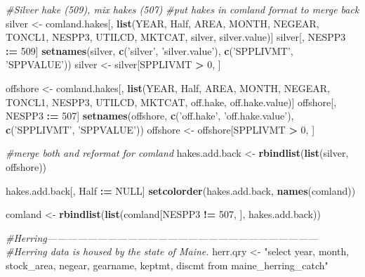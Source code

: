 \documentclass[]{article}
\newenvironment{Shaded}{\begin{snugshade}}{\end{snugshade}}
\newcommand{\KeywordTok}[1]{\textcolor[rgb]{0.13,0.29,0.53}{\textbf{#1}}}
\newcommand{\DecValTok}[1]{\textcolor[rgb]{0.00,0.00,0.81}{#1}}
\newcommand{\StringTok}[1]{\textcolor[rgb]{0.31,0.60,0.02}{#1}}
\newcommand{\CommentTok}[1]{\textcolor[rgb]{0.56,0.35,0.01}{\textit{#1}}}
\newcommand{\OtherTok}[1]{\textcolor[rgb]{0.56,0.35,0.01}{#1}}
\newcommand{\OperatorTok}[1]{\textcolor[rgb]{0.81,0.36,0.00}{\textbf{#1}}}
\newcommand{\ErrorTok}[1]{\textcolor[rgb]{0.64,0.00,0.00}{\textbf{#1}}}
\newcommand{\NormalTok}[1]{#1}
\begin{document}
\begin{Shaded}
\begin{Highlighting}[]
{{{{{{\CommentTok{#Silver hake (509), mix hakes (507)}
\CommentTok{#put hakes in comland format to merge back}
\NormalTok{silver <-}\StringTok{ }\NormalTok{comland.hakes[, }\KeywordTok{list}\NormalTok{(YEAR, Half, AREA, MONTH, NEGEAR,}
\NormalTok{                               TONCL1, NESPP3, UTILCD, MKTCAT, silver, }
\NormalTok{                               silver.value)]}
\NormalTok{silver[, NESPP3 }\OperatorTok{:}\ErrorTok{=}\StringTok{ }\DecValTok{509}\NormalTok{]}
\KeywordTok{setnames}\NormalTok{(silver, }\KeywordTok{c}\NormalTok{(}\StringTok{'silver'}\NormalTok{, }\StringTok{'silver.value'}\NormalTok{), }\KeywordTok{c}\NormalTok{(}\StringTok{'SPPLIVMT'}\NormalTok{, }\StringTok{'SPPVALUE'}\NormalTok{))}
\NormalTok{silver <-}\StringTok{ }\NormalTok{silver[SPPLIVMT }\OperatorTok{>}\StringTok{ }\DecValTok{0}\NormalTok{, ]}

\NormalTok{offshore <-}\StringTok{ }\NormalTok{comland.hakes[, }\KeywordTok{list}\NormalTok{(YEAR, Half, AREA, MONTH, NEGEAR,}
\NormalTok{                                 TONCL1, NESPP3, UTILCD, MKTCAT, off.hake, }
\NormalTok{                                 off.hake.value)]}
\NormalTok{offshore[, NESPP3 }\OperatorTok{:}\ErrorTok{=}\StringTok{ }\DecValTok{507}\NormalTok{]}
\KeywordTok{setnames}\NormalTok{(offshore, }\KeywordTok{c}\NormalTok{(}\StringTok{'off.hake'}\NormalTok{, }\StringTok{'off.hake.value'}\NormalTok{), }\KeywordTok{c}\NormalTok{(}\StringTok{'SPPLIVMT'}\NormalTok{, }\StringTok{'SPPVALUE'}\NormalTok{))}
\NormalTok{offshore <-}\StringTok{ }\NormalTok{offshore[SPPLIVMT }\OperatorTok{>}\StringTok{ }\DecValTok{0}\NormalTok{, ]}

\CommentTok{#merge both and reformat for comland}
\NormalTok{hakes.add.back <-}\StringTok{ }\KeywordTok{rbindlist}\NormalTok{(}\KeywordTok{list}\NormalTok{(silver, offshore))}

\NormalTok{hakes.add.back[, Half }\OperatorTok{:}\ErrorTok{=}\StringTok{ }\OtherTok{NULL}\NormalTok{]}
\KeywordTok{setcolorder}\NormalTok{(hakes.add.back, }\KeywordTok{names}\NormalTok{(comland))}

\NormalTok{comland <-}\StringTok{ }\KeywordTok{rbindlist}\NormalTok{(}\KeywordTok{list}\NormalTok{(comland[NESPP3 }\OperatorTok{!=}\StringTok{ }\DecValTok{507}\NormalTok{, ], hakes.add.back))}


\CommentTok{#Herring---------------------------------------------------------------------------------}
\CommentTok{#Herring data is housed by the state of Maine.}
\NormalTok{herr.qry <-}\StringTok{ "select year, month, stock_area, negear, gearname, keptmt, discmt}
\StringTok{             from maine_herring_catch"}

}}}}}}
\end{Highlighting}
\end{Shaded}
\end{document}
